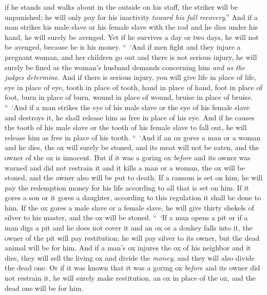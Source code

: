 \begin{biblechapter}
\verse if he stands and walks about in the outside on his staff, the striker will be unpunished; he will only pay for his inactivity \textit{toward his full recovery}.”
\verse And if a man strikes his male slave or his female slave with the rod and he dies under his hand, he will surely be avenged.
\verse Yet if he survives a day or two days, he will not be avenged, because he is his money.
\verse “ ‘And if men fight and they injure a pregnant woman, and her children go out and there is not serious injury, he will surely be fined as the woman’s husband demands concerning him \textit{and as the judges determine}.
\verse And if there is serious injury, you will give life in place of life,
\verse eye in place of eye, tooth in place of tooth, hand in place of hand, foot in place of foot,
\verse burn in place of burn, wound in place of wound, bruise in place of bruise.
\verse “ ‘And if a man strikes the eye of his male slave or the eye of his female slave and destroys it, he shall release him as free in place of his eye.
\verse And if he causes the tooth of his male slave or the tooth of his female slave to fall out, he will release him as free in place of his tooth.
\verse “ ‘And if an ox gores a man or a woman and he dies, the ox will surely be stoned, and its meat will not be eaten, and the owner of the ox is innocent.
\verse But if it was a goring ox \textit{before} and its owner was warned and did not restrain it and it kills a man or a woman, the ox will be stoned, and the owner also will be put to death.
\verse If a ransom is set on him, he will pay the redemption money for his life according to all that is set on him.
\verse If it gores a son or it gores a daughter, according to this regulation it shall be done to him.
\verse If the ox gores a male slave or a female slave, he will give thirty shekels of silver to his master, and the ox will be stoned.
\verse “ ‘If a man opens a pit or if a man digs a pit and he does not cover it and an ox or a donkey falls into it,
\verse the owner of the pit will pay restitution; he will pay silver to its owner, but the dead animal will be for him.
\verse And if a man’s ox injures the ox of his neighbor and it dies, they will sell the living ox and divide the \textit{money}, and they will also divide the dead one.
\verse Or if it was known that it was a goring ox \textit{before} and its owner did not restrain it, he will surely make restitution, an ox in place of the ox, and the dead one will be for him.
\end{biblechapter}

